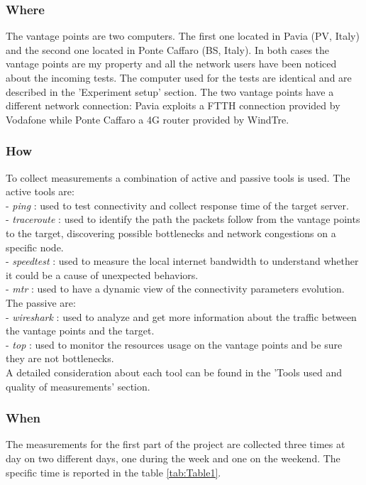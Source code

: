 \documentclass[a4paper,10pt]{article}
\begin{document}
\begin{multicols}{2}
\subsubsection*{Where}
The vantage points are two computers. The first one located in Pavia (PV, Italy) and the second one located in Ponte Caffaro (BS, Italy).
In both cases the vantage points are my property and all the network users have been noticed about the incoming tests. 
The computer used for the tests are identical and are described in the 'Experiment setup' section. The two vantage points have a different
network connection: Pavia exploits a FTTH connection provided by Vodafone while Ponte Caffaro a 4G router provided by WindTre.

\subsubsection*{How}
To collect measurements a combination of active and passive tools is used. The active tools are: \\
- \textit{ping} : used to test connectivity and collect response time of the target server. \\
- \textit{traceroute} : used to identify the path the packets follow from the vantage points to the target, discovering possible bottlenecks
and network congestions on a specific node. \\
- \textit{speedtest} : used to measure the local internet bandwidth to understand whether it could be a cause of unexpected
behaviors.\\
- \textit{mtr} : used to have a dynamic view of the connectivity parameters evolution.\\
The passive are: \\
- \textit{wireshark} : used to analyze and get more information about the traffic between the vantage points and the target.\\
- \textit{top} : used to monitor the resources usage on the vantage points and be sure they are not bottlenecks.\\
A detailed consideration about each tool can be found in the 'Tools used and quality of measurements' section.

\subsubsection*{When}
The measurements for the first part of the project are collected three times at day on two different days, one during the week and one on the weekend.
The specific time is reported in the table \ref{tab:Table1}.


\end{multicols}
\end{document}
